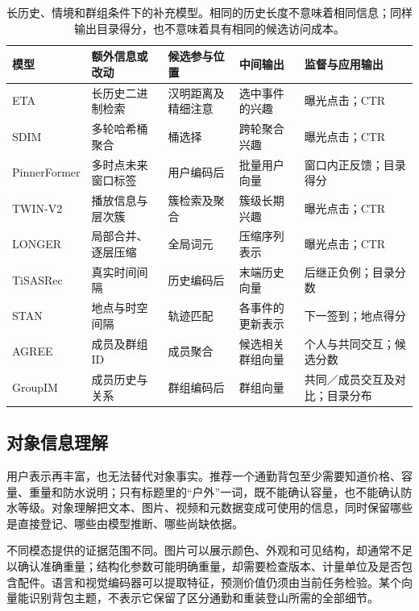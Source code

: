 \begin{table}[htbp]
  \centering
  \small
  \renewcommand{\arraystretch}{1.15}
  \begin{tabularx}{\linewidth}{@{}lXXXX@{}}
    \toprule
    模型 & 额外信息或改动 & 候选参与位置 & 中间输出 & 监督与应用输出 \\
    \midrule
    ETA & 长历史二进制检索 & 汉明距离及精细注意 & 选中事件的兴趣 & 曝光点击；CTR \\
    SDIM & 多轮哈希桶聚合 & 桶选择 & 跨轮聚合兴趣 & 曝光点击；CTR \\
    PinnerFormer & 多时点未来窗口标签 & 用户编码后 & 批量用户向量 & 窗口内正反馈；目录得分 \\
    TWIN-V2 & 播放信息与层次簇 & 簇检索及聚合 & 簇级长期兴趣 & 曝光点击；CTR \\
    LONGER & 局部合并、逐层压缩 & 全局词元 & 压缩序列表示 & 曝光点击；CTR \\
    TiSASRec & 真实时间间隔 & 历史编码后 & 末端历史向量 & 后继正负例；目录分数 \\
    STAN & 地点与时空间隔 & 轨迹匹配 & 各事件的更新表示 & 下一签到；地点得分 \\
    AGREE & 成员及群组ID & 成员聚合 & 候选相关群组向量 & 个人与共同交互；候选分数 \\
    GroupIM & 成员历史与关系 & 群组编码后 & 群组向量 & 共同／成员交互及对比；目录分布 \\
    \bottomrule
  \end{tabularx}
  \caption{长历史、情境和群组条件下的补充模型。相同的历史长度不意味着相同信息；同样输出目录得分，也不意味着具有相同的候选访问成本。}
  \label{tab:rs-behavior-extensions}
\end{table}

\subsection{对象信息理解}
\label{sec:rs-item-understanding}

用户表示再丰富，也无法替代对象事实。推荐一个通勤背包至少需要知道价格、容量、重量和防水说明；只有标题里的“户外”一词，既不能确认容量，也不能确认防水等级。对象理解把文本、图片、视频和元数据变成可使用的信息，同时保留哪些是直接登记、哪些由模型推断、哪些尚缺依据。

不同模态提供的证据范围不同。图片可以展示颜色、外观和可见结构，却通常不足以确认准确重量；结构化参数可能明确重量，却需要检查版本、计量单位及是否包含配件。语言和视觉编码器可以提取特征，预测价值仍须由当前任务检验。某个向量能识别背包主题，不表示它保留了区分通勤和重装登山所需的全部细节。

